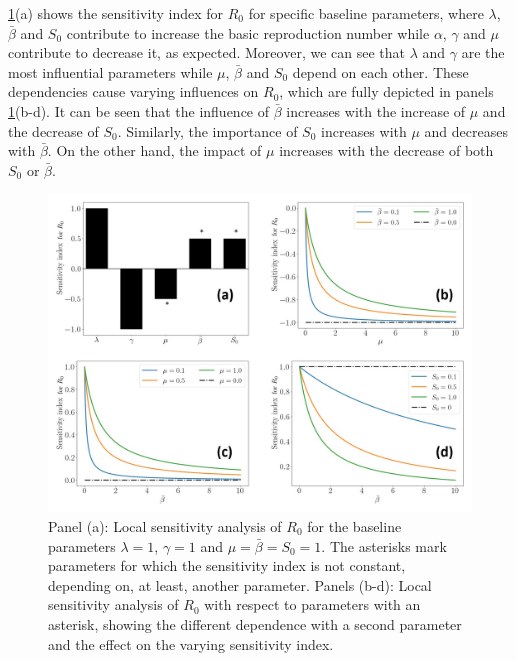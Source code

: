 \cref{fig:Local_Sensitivity_Analysis_R0}(a) shows the sensitivity index for
$R_0$ for specific baseline parameters, where $\lambda$, $\bar{\beta}$ and
$S_0$ contribute to increase the basic reproduction number while $\alpha$,
$\gamma$ and $\mu$ contribute to decrease it, as expected. Moreover, we can see
that $\lambda$ and $\gamma$ are the most influential parameters while $\mu$,
$\bar{\beta}$ and $S_0$ depend on each other. These dependencies cause varying
influences on $R_0$, which are fully depicted in panels
\cref{fig:Local_Sensitivity_Analysis_R0}(b-d). It can be seen that the
influence of $\bar{\beta}$ increases with the increase of $\mu$ and the
decrease of $S_0$. Similarly, the importance of $S_0$ increases with $\mu$ and
decreases with $\bar{\beta}$. On the other hand, the impact of $\mu$ increases
with the decrease of both $S_0$ or $\bar{\beta}$.

\begin{figure}[H]
    \centering
    \includegraphics[width=1\textwidth]{Figures/R_0_sensitivity.jpg}
    \caption{Panel (a): Local sensitivity analysis of $R_0$ for the
        baseline parameters $\lambda=1$, $\gamma=1$ and
        $\mu=\bar{\beta}=S_0=1$. The
        asterisks mark parameters for which the sensitivity index is not
        constant,
        depending on, at least, another parameter. Panels (b-d): Local
        sensitivity
        analysis of $R_0$ with respect to parameters with an asterisk, showing
        the
        different dependence with a second parameter and the effect on the
        varying
        sensitivity index.}
    \label{fig:Local_Sensitivity_Analysis_R0}
\end{figure}

